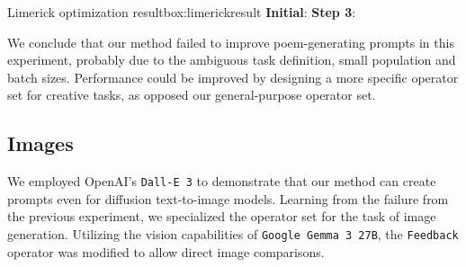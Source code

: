 \begin{figurebox}{Limerick optimization result}{box:limerickresult}
\textbf{Initial}:
\textbf{Step 3}:
\end{figurebox}

We conclude that our method failed to improve poem-generating prompts in this experiment, probably due to the 
ambiguous task definition, small population and batch sizes. Performance could be improved by designing 
a more specific operator set for creative tasks, as opposed our general-purpose operator set.

\subsection{Images}
We employed OpenAI's \texttt{Dall-E 3}\cite{BetkerImprovingIG} to demonstrate that our method can create prompts even for diffusion text-to-image models.
Learning from the failure from the previous experiment, we specialized the operator set for the task of image generation.
Utilizing the vision capabilities of \texttt{Google Gemma 3 27B}, the \texttt{Feedback} operator was modified to allow direct image comparisons. 

